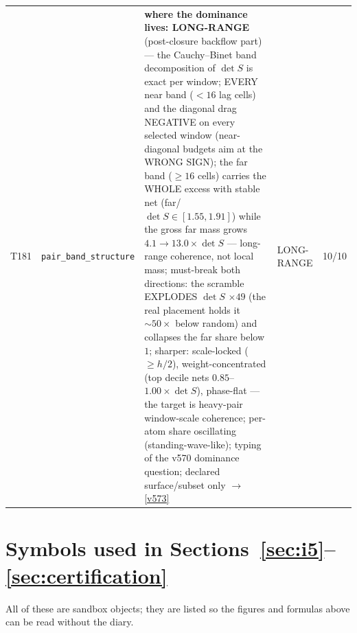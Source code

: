 \documentclass[11pt,a4paper]{article}
\begin{document}
{\begin{xltabular}{\linewidth}{@{}p{0.95cm} >{\raggedright\arraybackslash}p{3.1cm} Y >{\raggedright\scriptsize\arraybackslash}p{3.35cm} p{1.15cm}@{}}
T181 & \texttt{\scriptsize pair\_band\_\allowbreak structure} & \textbf{where the dominance lives: LONG-RANGE} (post-closure backflow part) --- the Cauchy--Binet band decomposition of $\det S$ is exact per window; EVERY near band ($<16$ lag cells) and the diagonal drag NEGATIVE on every selected window (near-diagonal budgets aim at the WRONG SIGN); the far band ($\ge16$ cells) carries the WHOLE excess with stable net (far/$\det S\in[1.55,1.91]$) while the gross far mass grows $4.1\to13.0\times\det S$ --- long-range coherence, not local mass; must-break both directions: the scramble EXPLODES $\det S$ $\times49$ (the real placement holds it ${\sim}50\times$ below random) and collapses the far share below $1$; sharper: scale-locked ($\ge h/2$), weight-concentrated (top decile nets $0.85$--$1.00\times\det S$), phase-flat --- the target is heavy-pair window-scale coherence; per-atom share oscillating (standing-wave-like); typing of the v570 dominance question; declared surface/subset only $\to$ \vref{v573} & LONG-RANGE & 10/10\\
\end{xltabular}
}

\section{Symbols used in Sections~\ref{sec:i5}--\ref{sec:certification}}\label{app:symbols}
\noindent All of these are sandbox objects; they are listed so the figures and formulas above can be
read without the diary.
\end{document}
